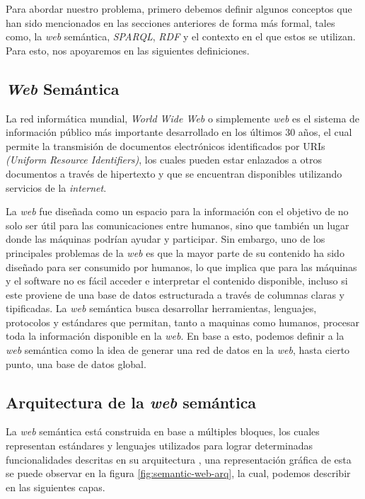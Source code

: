 
Para abordar nuestro problema, primero debemos definir algunos conceptos que han
sido mencionados en las secciones anteriores de forma más formal, tales como, la
\textit{web} semántica, \textit{SPARQL}, \textit{RDF} y el contexto en el que
estos se utilizan. Para esto, nos apoyaremos en las siguientes definiciones.

\subsection{\textit{Web} Semántica}

La red informática mundial, \textit{World Wide Web} o simplemente \textit{web}
es el sistema de información público más importante desarrollado en los últimos
30 años, el cual permite la transmisión de documentos electrónicos identificados
por URIs \textit{(Uniform Resource Identifiers)}, los cuales pueden estar
enlazados a otros documentos a través de hipertexto y que se encuentran
disponibles utilizando servicios de la \textit{internet}.

La \textit{web} fue diseñada como un espacio para la información con
el objetivo de no solo ser útil para las comunicaciones entre humanos, sino que
también un lugar donde las máquinas podrían ayudar y participar. Sin embargo,
uno de los principales problemas de la \textit{web} es que la mayor parte de su
contenido ha sido diseñado para ser consumido por humanos, lo que implica que
para las máquinas y el software no es fácil acceder e interpretar el contenido
disponible, incluso si este proviene de una base de datos estructurada a través
de columnas claras y tipificadas. La \textit{web} semántica busca desarrollar
herramientas, lenguajes, protocolos y estándares que permitan, tanto a maquinas
como humanos, procesar toda la información disponible en la \textit{web}. En
base a esto, podemos definir a la \textit{web} semántica como la idea de generar
una red de datos en la \textit{web}, hasta cierto punto, una base de datos
global.
\cite{berners1998semantic}

\subsection{Arquitectura de la \textit{web} semántica}

La \textit{web} semántica está construida en base a múltiples bloques, los
cuales representan estándares y lenguajes utilizados para lograr determinadas
funcionalidades descritas en su arquitectura \cite{harth2011semantic}, una
representación gráfica de esta se puede observar en la figura
\ref{fig:semantic-web-arq}, la cual, podemos describir en las siguientes capas.

